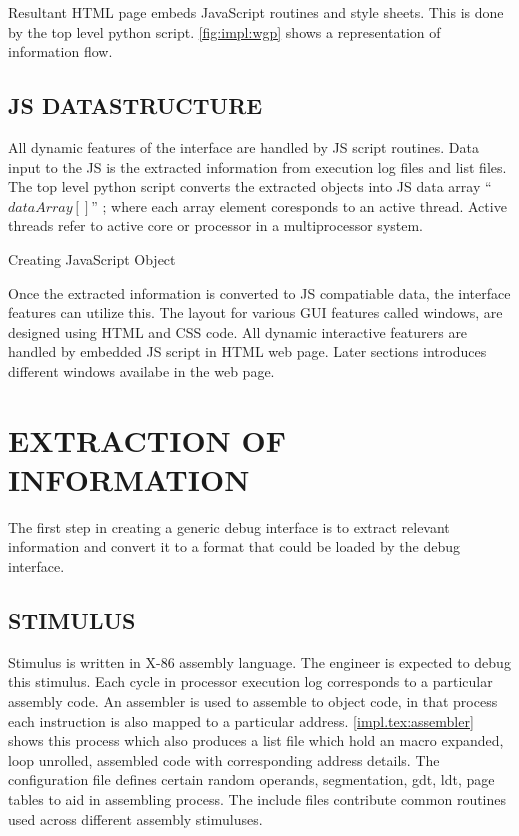 Resultant HTML page embeds JavaScript routines and style sheets. This is done by the top level python script. \figurename{\ref{fig:impl:wgp}} shows a representation of information flow.


\subsection{JS DATASTRUCTURE}
All dynamic features of the interface are handled by JS script routines. Data input to the JS is the extracted information from execution log files and list files. The top level python script converts the extracted objects into JS data array ``$dataArray[]$'' ; where each array element coresponds to an active thread. Active threads refer to active core or processor in a multiprocessor system.  

\IncMargin{1em}
\begin{algorithm}[h]
\DontPrintSemicolon
{} 
\KwFn {}
\BlankLine
{}
\caption{Creating JavaScript Object}
\end{algorithm}\DecMargin{1em}



Once the extracted information is converted to JS compatiable data, the interface features can utilize this. The layout for various GUI features called windows, are designed using HTML and CSS code. All dynamic interactive featurers are handled by embedded JS script in HTML web page. Later sections introduces different windows availabe in the web page.

\section {EXTRACTION OF INFORMATION}
The first step in creating a generic debug interface is to extract relevant information and convert it to a format that could be loaded by the debug interface.

\subsection {STIMULUS}
Stimulus is written in X-86 assembly language. The engineer is expected to debug this stimulus. Each cycle in processor execution log corresponds to a particular assembly code. An assembler is used to assemble to object code, in that process each instruction is also mapped to a particular address. \figurename{\ref{impl.tex:assembler}} shows this process which also produces a list file which hold an macro expanded, loop unrolled, assembled code with corresponding address details. The configuration file defines certain random operands, segmentation, gdt, ldt, page tables to aid in assembling process. The include files contribute common routines used across different assembly stimuluses.

